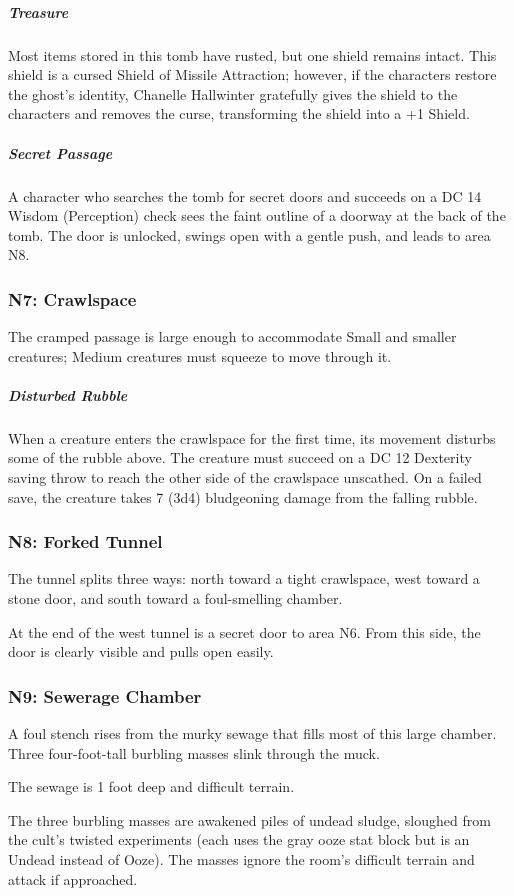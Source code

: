 \documentclass[10pt,a4paper,twoside,bg=print,twocolumn,openany,nodeprecatedcode]{dndbook}
\begin{document}
\subparagraph{Treasure}
Most items stored in this tomb have rusted, but one shield remains intact. This shield is a cursed Shield of Missile Attraction; however, if the characters restore the ghost's identity, Chanelle Hallwinter gratefully gives the shield to the characters and removes the curse, transforming the shield into a +1 Shield.
\subparagraph{Secret Passage}
A character who searches the tomb for secret doors and succeeds on a DC 14 Wisdom (Perception) check sees the faint outline of a doorway at the back of the tomb. The door is unlocked, swings open with a gentle push, and leads to area N8.
\subsubsection{N7: Crawlspace}
The cramped passage is large enough to accommodate Small and smaller creatures; Medium creatures must squeeze to move through it.
\subparagraph{Disturbed Rubble}
When a creature enters the crawlspace for the first time, its movement disturbs some of the rubble above. The creature must succeed on a DC 12 Dexterity saving throw to reach the other side of the crawlspace unscathed. On a failed save, the creature takes 7 (3d4) bludgeoning damage from the falling rubble.
\subsubsection{N8: Forked Tunnel}
\begin{DndReadAloud}{}
The tunnel splits three ways: north toward a tight crawlspace, west toward a stone door, and south toward a foul-smelling chamber.
\end{DndReadAloud}

At the end of the west tunnel is a secret door to area N6. From this side, the door is clearly visible and pulls open easily.
\subsubsection{N9: Sewerage Chamber}
\begin{DndReadAloud}{}
A foul stench rises from the murky sewage that fills most of this large chamber. Three four-foot-tall burbling masses slink through the muck.
\end{DndReadAloud}

The sewage is 1 foot deep and difficult terrain.

The three burbling masses are awakened piles of undead sludge, sloughed from the cult's twisted experiments (each uses the gray ooze stat block but is an Undead instead of Ooze). The masses ignore the room's difficult terrain and attack if approached.
\end{document}
